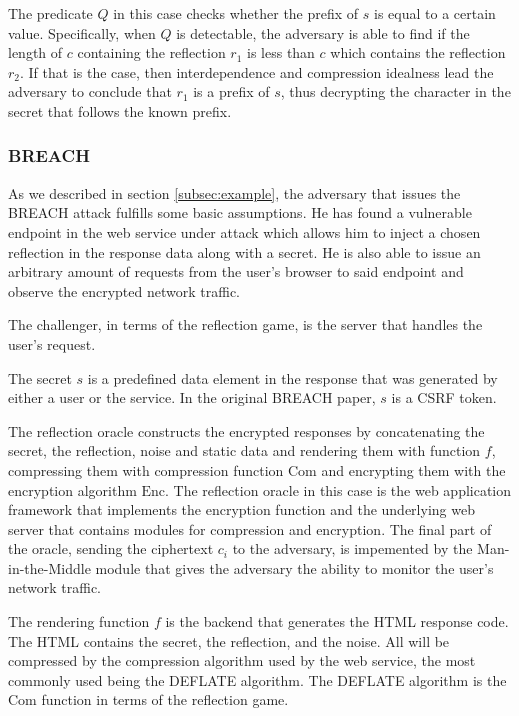 \documentclass[conference, letterpaper, 10pt]{IEEEtran}
\begin{document}
The predicate $Q$ in this case checks whether the prefix of $s$ is equal to a
certain value. Specifically, when $Q$ is detectable, the adversary is able to
find if the length of $c$ containing the reflection $r_1$ is less than
$c$ which contains the reflection $r_2$. If that is the case, then
interdependence and compression idealness lead the adversary to conclude that
$r_1$ is a prefix of $s$, thus decrypting the character in the secret that
follows the known prefix.

\subsubsection{BREACH}
As we described in section \ref{subsec:example}, the adversary that issues the
BREACH attack fulfills some basic assumptions. He has found a vulnerable
endpoint in the web service under attack which allows him to inject a chosen
reflection in the response data along with a secret. He is also able to issue an
arbitrary amount of requests from the user's browser to said endpoint and
observe the encrypted network traffic.

The challenger, in terms of the reflection game, is the server that handles the
user's request.

The secret $s$ is a predefined data element in the response that was generated
by either a user or the service. In the original BREACH paper, $s$ is a CSRF
token.

The reflection oracle constructs the encrypted responses by concatenating the
secret, the reflection, noise and static data and rendering them with function
$f$, compressing them with compression function $\textrm{Com}$ and encrypting them with
the encryption algorithm $\textrm{Enc}$. The reflection oracle in this case is the web
application framework that implements the encryption function and the underlying
web server that contains modules for compression and encryption. The final part
of the oracle, sending the ciphertext $c_i$ to the adversary, is impemented by
the Man-in-the-Middle module that gives the adversary the ability to monitor the
user's network traffic.

The rendering function $f$ is the backend that generates the HTML response code.
The HTML contains the secret, the reflection, and the noise. All will be
compressed by the compression algorithm used by the web service, the most
commonly used being the DEFLATE algorithm. The DEFLATE algorithm is the
$\textrm{Com}$ function in terms of the reflection game.
\end{document}
